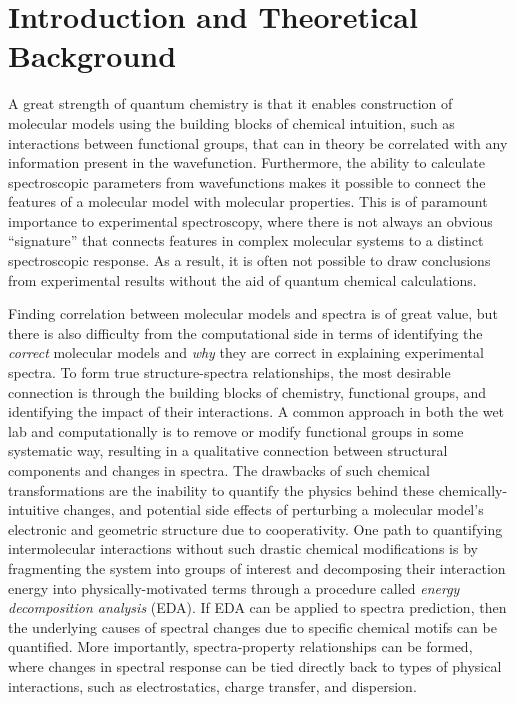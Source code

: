 \documentclass[%
class = book,%
crop = false,%
float = true,%
multi = true,%
preview = false,%
]{standalone}
\begin{document}
\onlyifstandalone{{\hypersetup{linkcolor=black}\tableofcontents{}}}
\chapter{Introduction and Theoretical Background}
\label{ch:introduction}

A great strength of quantum chemistry is that it enables construction of molecular models using the building blocks of chemical intuition, such as interactions between functional groups, that can in theory be correlated with any information present in the wavefunction. Furthermore, the ability to calculate spectroscopic parameters from wavefunctions makes it possible to connect the features of a molecular model with molecular properties. This is of paramount importance to experimental spectroscopy, where there is not always an obvious ``signature'' that connects features in complex molecular systems to a distinct spectroscopic response. As a result, it is often not possible to draw conclusions from experimental results without the aid of quantum chemical calculations.

Finding correlation between molecular models and spectra is of great value, but there is also difficulty from the computational side in terms of identifying the \emph{correct} molecular models and \emph{why} they are correct in explaining experimental spectra. To form true structure-spectra relationships, the most desirable connection is through the building blocks of chemistry, functional groups, and identifying the impact of their interactions. A common approach in both the wet lab and computationally is to remove or modify functional groups in some systematic way, resulting in a qualitative connection between structural components and changes in spectra. The drawbacks of such chemical transformations are the inability to quantify the physics behind these chemically-intuitive changes, and potential side effects of perturbing a molecular model's electronic and geometric structure due to cooperativity. One path to quantifying intermolecular interactions without such drastic chemical modifications is by fragmenting the system into groups of interest and decomposing their interaction energy into physically-motivated terms through a procedure called \emph{energy decomposition analysis} (EDA). If EDA can be applied to spectra prediction, then the underlying causes of spectral changes due to specific chemical motifs can be quantified. More importantly, spectra-property relationships can be formed, where changes in spectral response can be tied directly back to types of physical interactions, such as electrostatics, charge transfer, and dispersion.
\end{document}
